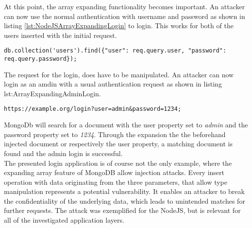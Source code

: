 At this point, the array expanding functionality becomes important. An attacker can now use the normal authentication with username and password as shown in listing \ref{lst:NodeJSArrayExpandingLogin} to login. This works for both of the users inserted with the initial request. \\

\begin{lstlisting}[caption={Example for vulnerable MongoDB - NodeJS application}, label={lst:NodeJSArrayExpandingLogin}]
db.collection('users').find({"user": req.query.user, "password": req.query.password});
\end{lstlisting}

The request for the login, does have to be manipulated. An attacker can now login as an amdin with a usual authentication request as shown in listing {lst:ArrayExpandingAdminLogin}.\\

\begin{lstlisting}[caption={MongoDB injection with NodeJS's query string module}, label={lst:ArrayExpandingAdminLogin}]
https://example.org/login?user=admin&password=1234;
\end{lstlisting}

MongoDb will search for a document with the user property set to \emph{admin} and the password property set to \emph{1234}. Through the expansion the the beforehand injected document or respectively the user property, a matching document is found and the admin login is successful.\\

The presented login application is of course not the only example, where the expanding array feature of MongoDB allow injection attacks. Every insert operation with data originating from the three parameters, that allow type manipulation represents a potential vulnerability. It enables an attacker to break the confidentiality of the underlying data, which leads to unintended matches for further requests. The attack was exemplified for the NodeJS, but is relevant for all of the investigated application layers. \\

